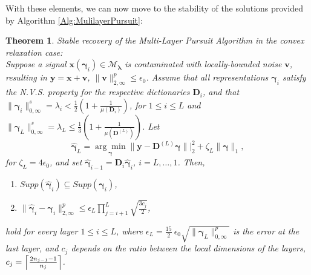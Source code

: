 \documentclass[10pt,journal]{IEEEtran}
\def\x{{\mathbf x}}
\def\v{{\mathbf v}}
\def\y{{\mathbf y}}
\def\D{{\mathbf D}}
\def\M{{\mathcal{M}}}
\def\gama{{\boldsymbol \gamma}}
\def\lamda{{\boldsymbol \lambda}}
\theoremstyle{plain}
\newtheorem{thm}{Theorem} %
\theoremstyle{definition}
\begin{document}
With these elements, we can now move to the stability of the solutions provided by Algorithm \ref{Alg:MulilayerPursuit}:

\begin{thm}{Stable recovery of the Multi-Layer Pursuit Algorithm in the convex relaxation case:} \label{Thm:StabilityPursuitLasso} \\
	Suppose a signal $\x(\gama_i) \in \M_\lamda$ is contaminated with locally-bounded noise $\v$, resulting in $\y = \x + \v$, $\|\v\|^p_{2,\infty} \leq \epsilon_0$. Assume that all representations $\gama_i$ satisfy the N.V.S. property for the respective dictionaries $\D_i$, and that $\|\gama_i\|^s_{0,\infty} = \lambda_i < \frac{1}{2}\left(1+\frac{1}{\mu(\D_i)}\right)$, for $1\leq i \leq L$ and $\|\gama_L\|^s_{0,\infty} = \lambda_L \leq \frac{1}{3}\left(1+\frac{1}{\mu(\D^{(L)})}\right)$. Let
	\begin{equation}
		\hat{\gama}_L = \underset{\gama}{\arg\min} \| \y - \D^{(L)} \gama \||^2_2 + \zeta_L \|\gama\|_1,
	\end{equation}
	for $\zeta_L = 4\epsilon_0$, and set $\hat{\gama}_{i-1} = \D_i\hat{\gama}_i$, $i=L,\dots,1$.  Then,
	\begin{enumerate}
		\item $Supp(\hat{\gama}_i) \subseteq Supp(\gama_i)$,
		\item $\|\hat{\gama}_i - \gama_i\|^p_{2,\infty} \leq \epsilon_L  \displaystyle\prod\limits_{j=i+1}^{L} \sqrt{\frac{3 c_j}{2}}$,
	\end{enumerate}
	hold for every layer $1\leq i\leq L$, where $\epsilon_L = \frac{15}{2}\ \epsilon_0 \sqrt{\|\gama_L\|^p_{0,\infty}}$ is the error at the last layer, and  $c_j$ depends on the ratio between the local dimensions of the layers, $c_j = \Bigl\lceil \frac{2n_{j-1}-1}{n_j} \Bigr\rceil$.
\end{thm}
\end{document}
